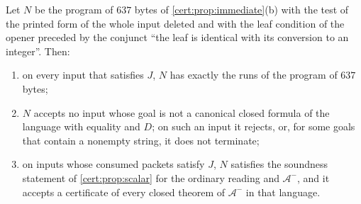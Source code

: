 \begin{proposition}\label{cert:prop:native-int}
Let $N$ be the program of $637$ bytes of \cref{cert:prop:immediate}(b) with
the test of the printed form of the whole input deleted and with the leaf
condition of the opener preceded by the conjunct ``the leaf is identical with
its conversion to an integer''. Then:
\begin{enumerate}[label=(\alph*)]
\item on every input that satisfies $J$, $N$ has exactly the runs of the
program of $637$ bytes;
\item $N$ accepts no input whose goal is not a canonical closed formula of the
language with equality and $D$; on such an input it rejects, or, for some goals
that contain a nonempty string, it does not terminate;
\item on inputs whose consumed packets satisfy $J$, $N$ satisfies the soundness
statement of \cref{cert:prop:scalar} for the ordinary reading and
$\mathcal A^{-}$, and it accepts a certificate of every closed theorem of
$\mathcal A^{-}$ in that language.
\end{enumerate}
\end{proposition}
